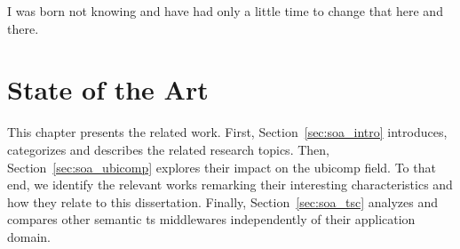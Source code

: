 
\begin{savequote}[50mm]
I was born not knowing and have had only a little time to change that here and there.
\end{savequote}


\chapter{State of the Art}
\label{cha:stateoftheart}
\newcommand{\pathchaptwo}{2_state_of_the_art}

\ifpdf
    \graphicspath{{\pathchaptwo/figures/PNG/}{\pathchaptwo/figures/PDF/}{\pathchaptwo/figures/}}
\else
    \graphicspath{{\pathchaptwo/figures/EPS/}{\pathchaptwo/figures/}}
\fi



This chapter presents the related work.
First, Section~\ref{sec:soa_intro} introduces, categorizes and describes the related research topics. %
Then, Section~\ref{sec:soa_ubicomp} explores their impact on the \ac{ubicomp} field. %
To that end, we identify the relevant works remarking their interesting characteristics and how they relate to this dissertation.
Finally, Section~\ref{sec:soa_tsc} analyzes and compares other semantic \ac{ts} middlewares independently of their application domain.












